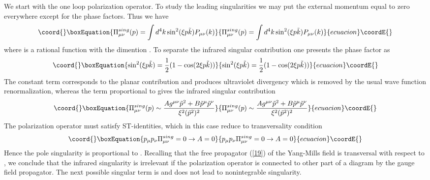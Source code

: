 \documentclass[a4paper,12pt]{article}
\begin{document}
 We start with the one loop polarization operator. To study the leading 
 singularities we may put the external momentum equal to zero everywhere 
except for the phase factors. Thus we have
\begin{equation}\coord{}\boxEquation{   
\Pi_{\mu \nu}^{sing}(p)= \int d^4k \sin^2(\xi p \tilde{k})P_{\mu 
\nu}(k)
 \label{20} }{   
\Pi_{\mu \nu}^{sing}(p)= \int d^4k \sin^2(\xi p \tilde{k})P_{\mu 
\nu}(k)
 }{ecuacion}\coordE{}\end{equation} 
where \coordHE{} is a rational function with the dimention \coordHE{}. To 
separate the infrared singular contribution one presents the phase 
factor as 
\begin{equation}\coord{}\boxEquation{ 
\sin^2(\xi p \tilde{k})= \frac{1}{2}(1- \cos(2\xi p \tilde{k}))
\label{21} 
}{ 
\sin^2(\xi p \tilde{k})= \frac{1}{2}(1- \cos(2\xi p \tilde{k}))
}{ecuacion}\coordE{}\end{equation} 
The constant term corresponds to the planar contribution and produces 
ultraviolet divergency which is removed by the usual wave function 
renormalization, whereas the term proportional to \coordHE{} gives the infrared singular contribution \begin{equation}\coord{}\boxEquation{ 
\Pi_{\mu \nu}^{sing}(p) \sim \frac{Ag^{\mu 
\nu}\tilde{p}^2+B\tilde{p}^{\mu} \tilde{p}^{\nu}}{ \xi^2(\tilde{p}^2)^2} 
 \label{22} 
}{ 
\Pi_{\mu \nu}^{sing}(p) \sim \frac{Ag^{\mu 
\nu}\tilde{p}^2+B\tilde{p}^{\mu} \tilde{p}^{\nu}}{ \xi^2(\tilde{p}^2)^2} 
 }{ecuacion}\coordE{}\end{equation} 
The polarization operator must satisfy ST-identities, which in this case 
reduce to transversality condition
\begin{equation}\coord{}\boxEquation{
p_{\mu}p_{\nu} \Pi_{\mu \nu}^{sing}=0 \rightarrow A=0
\label{23} 
}{
p_{\mu}p_{\nu} \Pi_{\mu \nu}^{sing}=0 \rightarrow A=0
}{ecuacion}\coordE{}\end{equation} 
Hence the pole singularity is proportional to \coordHE{}.  Recalling that the free propagator (\ref{19}) of the 
Yang-Mills field \coordHE{} is transversal with respect to \coordHE{}, we conclude that the infrared singularity is 
irrelevant if the polarization operator is connected to other part of 
a diagram by the gauge field propagator.
 The next possible singular term is \coordHE{} and 
does not lead to nonintegrable singularity.
\end{document}
